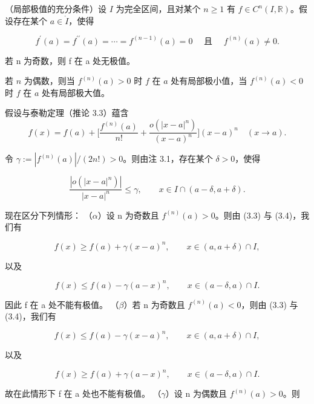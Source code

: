 \begin{application}

\begin{items}
\item

（局部极值的充分条件）设 $ I $ 为完全区间，且对某个 $ n \geq 1 $ 有 $ f \in C^n(I, \mathbb{R}) $。假设存在某个 $ a \in \mathring{I} $，使得

\[
f^{\prime}(a)=f^{\prime\prime}(a)=\cdots=f^{(n-1)}(a)=0\quad\text{ 且 }\quad f^{(n)}(a)\neq0.
\]

\begin{subitems}
\item

若 n 为奇数，则 f 在 a 处无极值。

\item

若 $n$ 为偶数，则当 $f^{(n)}(a) > 0$ 时 $f$ 在 $a$ 处有局部极小值，当 $f^{(n)}(a) < 0$ 时 $f$ 在 $a$ 处有局部极大值。

\proofhead
假设与泰勒定理（推论 3.3）蕴含
\begin{equation}
f(x)=f(a)+\Big[\frac{f^{(n)}(a)}{n!}+\frac{o(|x-a|^{n})}{(x-a)^{n}}\Big](x-a)^{n}\quad(x\to a).
\end{equation}

令 $ \gamma := |f^{(n)}(a)|/(2n!) > 0 $。则由注 3.1，存在某个 $ \delta > 0 $，使得

\begin{equation}
\frac{\left|o(|x-a|^{n})\right|}{|x-a|^{n}}\leq\gamma,\qquad x\in I\cap(a-\delta,a+\delta).
\end{equation}

现在区分下列情形：
（$ \alpha $）设 n 为奇数且 $ f^{(n)}(a) > 0 $。则由 (3.3) 与 (3.4)，我们有

\[
f(x)\geq f(a)+\gamma(x-a)^{n},\qquad x\in(a,a+\delta)\cap I,
\]

以及

\[
f(x)\leq f(a)-\gamma(a-x)^{n},\qquad x\in(a-\delta,a)\cap I.
\]

因此 f 在 a 处不能有极值。
（$ \beta $）若 n 为奇数且 $ f^{(n)}(a) < 0 $，则由 (3.3) 与 (3.4)，我们有

\[
f(x)\leq f(a)-\gamma(x-a)^{n},\qquad x\in(a,a+\delta)\cap I,
\]

以及

\[
f(x)\geq f(a)+\gamma(a-x)^{n},\qquad x\in(a-\delta,a)\cap I.
\]

故在此情形下 f 在 a 处也不能有极值。
（$ \gamma $）设 n 为偶数且 $ f^{(n)}(a) > 0 $。则


\end{subitems}
\end{items}
\end{application}
